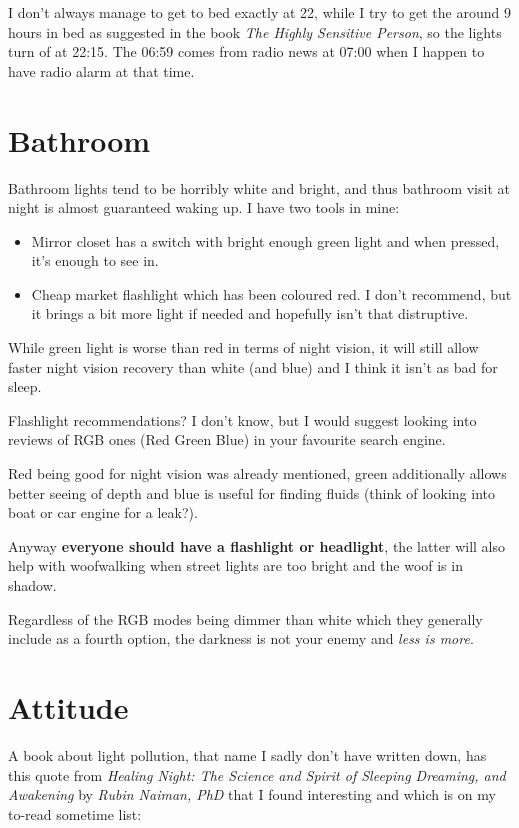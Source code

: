 \documentclass[a4paper]{boek3}
\begin{document}
I don't always manage to get to bed exactly at 22, while I try to get the around 9 hours in bed as suggested in the book \textit{The Highly Sensitive Person}, so the lights turn of at 22:15.
The 06:59 comes from radio news at 07:00 when I happen to have radio alarm at that time.

\chapter{Bathroom}

Bathroom lights tend to be horribly white and bright, and thus bathroom visit at night is almost guaranteed waking up. I have two tools in mine:

\begin{itemize}
    \item Mirror closet has a switch with bright enough green light and when pressed, it's enough to see in.
    \item Cheap market flashlight which has been coloured red. I don't recommend, but it brings a bit more light if needed and hopefully isn't that distruptive.
\end{itemize}

While green light is worse than red in terms of night vision, it will still allow faster night vision recovery than white (and blue) and I think it isn't as bad for sleep.

Flashlight recommendations? I don't know, but I would suggest looking into reviews of RGB ones (Red Green Blue) in your favourite search engine.

Red being good for night vision was already mentioned, green additionally allows better seeing of depth and blue is useful for finding fluids (think of looking into boat or car engine for a leak?).

Anyway \textbf{everyone should have a flashlight or headlight}, the latter will also help with woofwalking when street lights are too bright and the woof is in shadow.

Regardless of the RGB modes being dimmer than white which they generally include as a fourth option, the darkness is not your enemy and \textit{less is more}.

\chapter{Attitude}

A book about light pollution, that name I sadly don't have written down, has this quote from \textit{Healing Night: The Science and Spirit of Sleeping Dreaming, and Awakening} by \textit{Rubin Naiman, PhD} that I found interesting and which is on my to-read sometime list:
\end{document}
